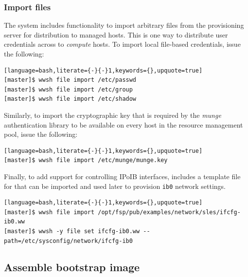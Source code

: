 \documentclass[letterpaper]{article}
\begin{document}
\subsubsection{Import files} \label{sec:file_import}

The \Warewulf{} system includes functionality to import arbitrary files from the
provisioning server for distribution to managed hosts. This is one way
to distribute user credentials across to {\em compute} hosts. To
import local file-based credentials, issue the following:

\begin{lstlisting}[language=bash,literate={-}{-}1,keywords={},upquote=true]
[master]$ wwsh file import /etc/passwd                                                                                                       
[master]$ wwsh file import /etc/group
[master]$ wwsh file import /etc/shadow 
\end{lstlisting}

Similarly, to import the cryptographic key that is required by the {\em munge}
authentication library to be available on every host in the resource management
pool, issue the following:

\begin{lstlisting}[language=bash,literate={-}{-}1,keywords={},upquote=true]
[master]$ wwsh file import /etc/munge/munge.key
\end{lstlisting}

Finally, to add support for controlling IPoIB interfaces, \FSP{} includes a
template file for \Warewulf{} that can be imported and used later to provision
\texttt{ib0} network settings.

\begin{lstlisting}[language=bash,literate={-}{-}1,keywords={},upquote=true]
[master]$ wwsh file import /opt/fsp/pub/examples/network/sles/ifcfg-ib0.ww
[master]$ wwsh -y file set ifcfg-ib0.ww --path=/etc/sysconfig/network/ifcfg-ib0
\end{lstlisting}


\subsection{Assemble bootstrap image}
\end{document}
